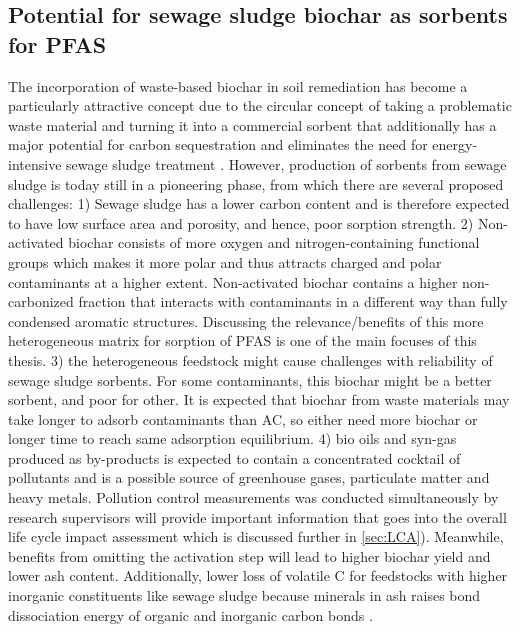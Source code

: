 \subsection{Potential for sewage sludge biochar as sorbents for PFAS}
The incorporation of waste-based biochar in soil remediation has become a particularly attractive concept due to the circular concept of taking a problematic waste material and turning it into a commercial sorbent that additionally has a major potential for carbon sequestration and eliminates the need for energy-intensive sewage sludge treatment \citep{arvaniti2014sorption}. However, production of sorbents from sewage sludge is today still in a pioneering phase, from which there are several proposed challenges: 1) Sewage sludge has a lower carbon content and is therefore expected to have low surface area and porosity, and hence, poor sorption strength. 2) Non-activated biochar consists of more oxygen and nitrogen-containing functional groups which makes it more polar and thus attracts charged and polar contaminants at a higher extent. Non-activated biochar contains a higher non-carbonized fraction that interacts with contaminants in a different way than fully condensed aromatic structures. Discussing the relevance/benefits of this more heterogeneous matrix for sorption of PFAS is one of the main focuses of this thesis. 3) the heterogeneous feedstock might cause challenges with reliability of sewage sludge sorbents. For some contaminants, this biochar might be a better sorbent, and poor for other. It is expected that biochar from waste materials may take longer to adsorb contaminants than AC, so either need more biochar or longer time to reach same adsorption equilibrium. 4) bio oils and syn-gas produced as by-products is expected to contain a concentrated cocktail of pollutants and is a possible source of greenhouse gases, particulate matter and heavy metals. Pollution control measurements was conducted simultaneously by research supervisors will provide important information that goes into the overall life cycle impact assessment which is discussed further in \cref{sec:LCA}). Meanwhile, benefits from omitting the activation step will lead to higher biochar yield and lower ash content. Additionally, lower loss of volatile C for feedstocks with higher inorganic constituents like sewage sludge because minerals in ash raises bond dissociation energy of organic and inorganic carbon bonds \citep{Cantrell2012,Enders2012}. 

